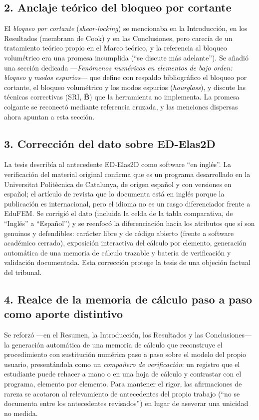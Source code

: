 \documentclass[11pt,a4paper]{article}
\begin{document}
\subsection*{2. Anclaje teórico del bloqueo por cortante}

El \emph{bloqueo por cortante} (\emph{shear-locking}) se mencionaba en la Introducción, en los
Resultados (membrana de Cook) y en las Conclusiones, pero carecía de un tratamiento teórico
propio en el Marco teórico, y la referencia al bloqueo volumétrico era una promesa
incumplida (``se discute más adelante''). Se añadió una sección dedicada —\emph{Fenómenos
numéricos en elementos de bajo orden: bloqueo y modos espurios}— que define con respaldo
bibliográfico el bloqueo por cortante, el bloqueo volumétrico y los modos espurios
(\emph{hourglass}), y discute las técnicas correctivas (SRI, $\bar{\bm{B}}$) que la herramienta
no implementa. La promesa colgante se reconectó mediante referencia cruzada, y las menciones
dispersas ahora apuntan a esta sección.

\subsection*{3. Corrección del dato sobre ED-Elas2D}

La tesis describía al antecedente ED-Elas2D como software ``en inglés''. La verificación del
material original confirma que es un programa desarrollado en la Universitat Politècnica de
Catalunya, de origen español y con versiones en español; el artículo de revista que lo
documenta está en inglés porque la publicación es internacional, pero el idioma no es un rasgo
diferenciador frente a EduFEM. Se corrigió el dato (incluida la celda de la tabla comparativa,
de ``Inglés'' a ``Español'') y se reenfocó la diferenciación hacia los atributos que sí son
genuinos y defendibles: carácter libre y de código abierto (frente a software académico
cerrado), exposición interactiva del cálculo por elemento, generación automática de una
memoria de cálculo trazable y batería de verificación y validación documentada. Esta
corrección protege la tesis de una objeción factual del tribunal.

\subsection*{4. Realce de la memoria de cálculo paso a paso como aporte distintivo}

Se reforzó —en el Resumen, la Introducción, los Resultados y las Conclusiones— la generación
automática de una memoria de cálculo que reconstruye el procedimiento con sustitución numérica
paso a paso sobre el modelo del propio usuario, presentándola como un \emph{compañero de
verificación}: un registro que el estudiante puede rehacer a mano o en una hoja de cálculo y
contrastar con el programa, elemento por elemento. Para mantener el rigor, las afirmaciones de
rareza se acotaron al relevamiento de antecedentes del propio trabajo (``no se documenta entre
los antecedentes revisados'') en lugar de aseverar una unicidad no medida.
\end{document}
